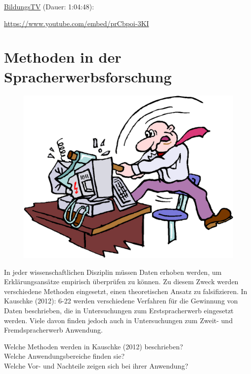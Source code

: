 \documentclass[
  letterpaper,
]{scrbook}
\begin{document}
\href{https://www.youtube.com/watch?v=prCbpoi-3KI}{BildungsTV} (Dauer:
1:04:48):

\url{https://www.youtube.com/embed/prCbpoi-3KI}

\hypertarget{sec-spracherwerb}{%
\chapter{Methoden in der
Spracherwerbsforschung}\label{sec-spracherwerb}}

\begin{figure}

{\centering 

\href{https://www.clipartmax.com/middle/m2i8K9i8K9m2i8A0_solutions-for-reducing-leadership-burnout-technology-doesn-t-work/}{\includegraphics[width=1\textwidth,height=\textheight]{./pictures/clipart55029.png}}

}

\end{figure}

In jeder wissenschaftlichen Disziplin müssen Daten erhoben werden, um
Erklärungsansätze empirisch überprüfen zu können. Zu diesem Zweck werden
verschiedene Methoden eingesetzt, einen theoretischen Ansatz zu
falsifizieren. In Kauschke (2012): 6-22 werden verschiedene Verfahren
für die Gewinnung von Daten beschrieben, die in Untersuchungen zum
Erstspracherwerb eingesetzt werden. Viele davon finden jedoch auch in
Untersuchungen zum Zweit- und Fremdspracherwerb Anwendung.

Welche Methoden werden in Kauschke (2012) beschrieben?\\
Welche Anwendungsbereiche finden sie?\\
Welche Vor- und Nachteile zeigen sich bei ihrer Anwendung?
\end{document}
